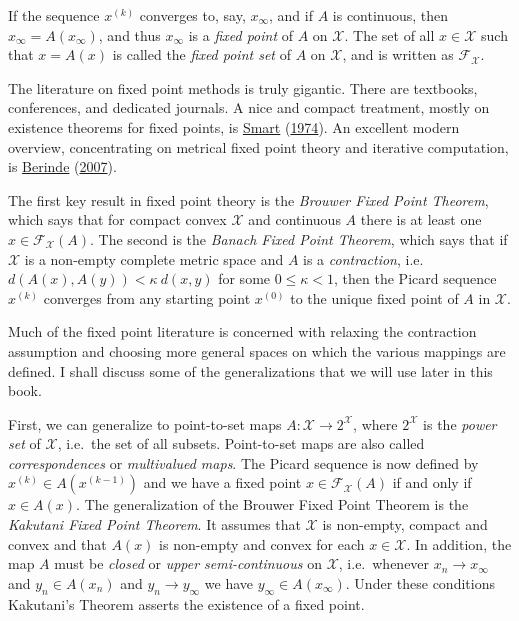 \documentclass[
  12pt,
]{book}
\begin{document}
If the sequence \(x^{(k)}\) converges to, say, \(x_\infty\), and if \(A\) is continuous, then \(x_\infty=A(x_\infty)\), and
thus \(x_\infty\) is a \emph{fixed point} of \(A\) on \(\mathcal{X}\).
The set of all \(x\in\mathcal{X}\) such that \(x=A(x)\) is called the \emph{fixed point set} of \(A\) on \(\mathcal{X}\), and is written as \(\mathcal{F}_\mathcal{X}\).

The literature on fixed point methods is truly gigantic. There are textbooks, conferences, and dedicated journals. A nice and compact treatment, mostly on existence theorems for fixed points, is \protect\hyperlink{ref-smart_74}{Smart} (\protect\hyperlink{ref-smart_74}{1974}). An excellent modern overview, concentrating on metrical fixed point theory and iterative computation, is \protect\hyperlink{ref-berinde_07}{Berinde} (\protect\hyperlink{ref-berinde_07}{2007}).

The first key result in fixed point theory is the \emph{Brouwer Fixed Point Theorem}, which says that for compact convex \(\mathcal{X}\) and continuous \(A\) there is at least one \(x\in\mathcal{F}_\mathcal{X}(A)\).
The second is the \emph{Banach Fixed Point Theorem}, which says that if \(\mathcal{X}\) is a non-empty complete metric space and \(A\) is a \emph{contraction}, i.e.~\(d(A(x),A(y))<\kappa\ d(x,y)\) for some \(0\leq\kappa<1\), then the Picard sequence \(x^{(k)}\) converges from any starting point \(x^{(0)}\) to the unique fixed point of \(A\) in \(\mathcal{X}\).

Much of the fixed point literature is concerned with relaxing the contraction assumption and choosing more general spaces on which the various mappings are defined. I shall discuss some of the generalizations that we will use later in this book.

First, we can generalize to point-to-set maps \(A:\mathcal{X}\rightarrow 2^\mathcal{X}\), where \(2^\mathcal{X}\) is the \emph{power set} of \(\mathcal{X}\), i.e.~the set of all subsets. Point-to-set maps are also called \emph{correspondences} or \emph{multivalued maps}. The Picard sequence is now defined by \(x^{(k)}\in A(x^{(k-1)})\) and we have a fixed point \(x\in\mathcal{F}_\mathcal{X}(A)\) if and only if \(x\in A(x)\). The generalization of the Brouwer Fixed Point Theorem is the \emph{Kakutani Fixed Point Theorem}.
It assumes that \(\mathcal{X}\) is non-empty, compact and convex and that \(A(x)\) is non-empty and convex for each \(x\in\mathcal{X}\).
In addition, the map \(A\) must be \emph{closed} or \emph{upper semi-continuous} on \(\mathcal{X}\),
i.e.~whenever \(x_n\rightarrow x_\infty\) and \(y_n\in A(x_n)\) and \(y_n\rightarrow y_\infty\) we have \(y_\infty\in A(x_\infty)\).
Under these conditions Kakutani's Theorem asserts the existence of a fixed point.
\end{document}
